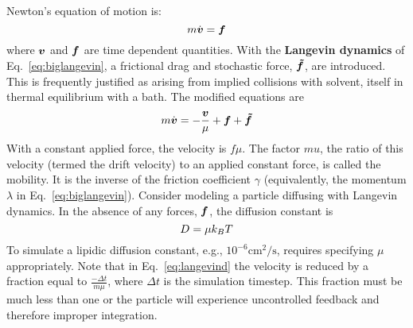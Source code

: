 
 \label{sec:timescales}


Newton's equation of motion is:
\begin{equation}
m \dot{\boldsymbol{v}} = \boldsymbol{f}
\end{equation}
where $\boldsymbol{v}$ and $\boldsymbol{f}$ are time dependent quantities.
With the {\bf Langevin dynamics} of Eq.~\ref{eq:biglangevin}, a frictional drag and stochastic force, $\boldsymbol{\tilde{f}}$, are introduced.
This is frequently justified as arising from implied collisions with solvent, itself in thermal equilibrium with a bath.
The modified equations are
\begin{equation}
m \dot{\boldsymbol{v}} = -\frac{\boldsymbol{v}}{\mu} + \boldsymbol{f} + \boldsymbol{\tilde{f}}
\label{eq:langevind}
\end{equation}
With a constant applied force, the velocity is $f \mu$.
The factor $mu$, the ratio of this velocity (termed the drift velocity) to an applied constant force, is called the mobility. 
It is the inverse of the friction coefficient $\gamma$ (equivalently, the momentum $\lambda$ in Eq.~\ref{eq:biglangevin}).
Consider modeling a particle diffusing with Langevin dynamics.
In the absence of any forces, $\boldsymbol{f}$, the diffusion constant is
\begin{equation}
D = \mu k_B T
\end{equation}
To simulate a lipidic diffusion constant, e.g., $10^{-6} \textrm{cm}^2/\textrm{s}$, requires specifying $\mu$ appropriately.
Note that in Eq.~\ref{eq:langevind} the velocity is reduced by a fraction equal to $\frac{-\Delta t}{m \mu}$,
where $\Delta t$ is the simulation timestep.
This fraction must be much less than one or the particle will experience uncontrolled feedback and therefore improper integration.


\label{sec:brownian}

